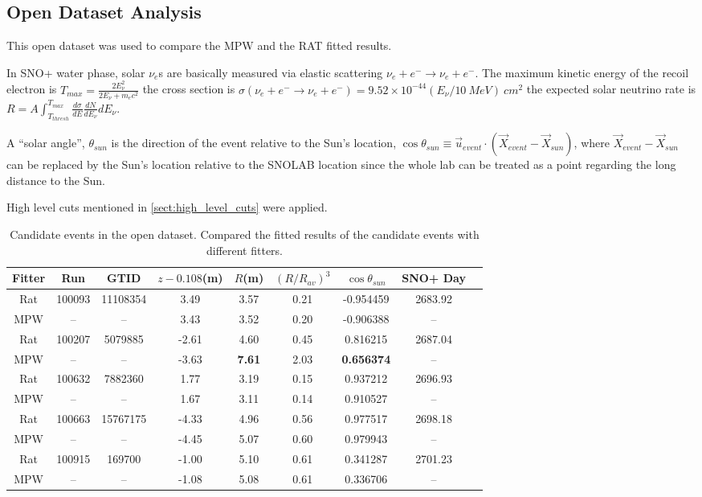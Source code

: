 \subsection{Open Dataset Analysis}

This open dataset was used to compare the MPW and the RAT fitted results.

In SNO+ water phase, solar $\nu_e$s are basically measured via elastic scattering $\nu_e+e^-\to \nu_e+e^-$. The maximum kinetic energy of the recoil electron is
$T_{max}=\frac{2E^2_\nu}{2E_\nu+m_e c^2}$
the cross section is $\sigma(\nu_e+e^-\to \nu_e+e^-)=9.52\times 10^{-44}(E_\nu/10~MeV)~cm^2$
the expected solar neutrino rate is 
$R=A\int_{T_{thresh}}^{T_{max}}\frac{d\sigma}{dE}\frac{dN}{dE_\nu}dE_\nu$.

A ``solar angle'', $\theta_{sun}$ is the direction of the event relative to the Sun's location,
$\cos\theta_{sun}\equiv \vec u_{event}\cdot (\vec{X}_{event}-\vec{X}_{sun})$, where $\vec{X}_{event}-\vec{X}_{sun}$ can be replaced by the Sun's location relative to the SNOLAB location since the whole lab can be treated as a point regarding the long distance to the Sun.


High level cuts mentioned in \ref{sect:high_level_cuts} were applied.

\begin{table}[ht]
	\centering
	\caption{Candidate events in the open dataset. Compared the fitted results of the candidate events with different fitters.}
	\label{opendata}
	\begin{tabular*}{150mm}{c@{\extracolsep{\fill}}cccccccc}
		\toprule
		Fitter &	Run &  GTID &  $z-0.108$(m) & $R$(m)& $(R/R_{av})^3$ & $\cos\theta_{sun}$ & SNO+ Day\\
		\hline 
		Rat & 100093 &11108354 &3.49 &3.57 &0.21 &-0.954459 &2683.92 \\	
		MPW &  --& --& 3.43 &	3.52 &	0.20	& -0.906388 & --\\
		Rat &	100207 &5079885 &-2.61 &4.60 &0.45 &0.816215 &2687.04\\
		MPW &	 --& --& -3.63 & \textbf{7.61} &	2.03 & \textbf{0.656374} & -- \\
		Rat &100632 &7882360 &1.77 &3.19 &0.15 &0.937212 &2696.93\\
		MPW &    --& --&  1.67 & 3.11 &	0.14 & 0.910527 & -- \\
		Rat &100663 &15767175 &-4.33& 4.96 &0.56 &0.977517 &2698.18\\
		MPW & --& -- &-4.45 &	5.07 &	0.60 &	0.979943 & -- \\
		Rat &100915 &169700 &-1.00 &5.10 &0.61 &0.341287 &2701.23\\
		MPW &	--& --& -1.08 &	5.08 &	0.61 &	0.336706 & -- \\	
		\bottomrule
	\end{tabular*}
\end{table}

